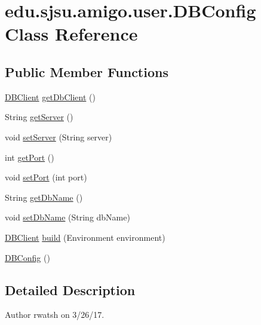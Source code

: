 \hypertarget{classedu_1_1sjsu_1_1amigo_1_1user_1_1_d_b_config}{}\section{edu.\+sjsu.\+amigo.\+user.\+D\+B\+Config Class Reference}
\label{classedu_1_1sjsu_1_1amigo_1_1user_1_1_d_b_config}
\subsection*{Public Member Functions}
\begin{DoxyCompactItemize}
\item 
\hyperlink{interfaceedu_1_1sjsu_1_1amigo_1_1db_1_1common_1_1_d_b_client}{D\+B\+Client} \hyperlink{classedu_1_1sjsu_1_1amigo_1_1user_1_1_d_b_config_af4640d5927a8f24bfba9da51d9485ace}{get\+Db\+Client} ()
\item 
String \hyperlink{classedu_1_1sjsu_1_1amigo_1_1user_1_1_d_b_config_aa621bfa8278d8210594a7dc1388bbed3}{get\+Server} ()
\item 
void \hyperlink{classedu_1_1sjsu_1_1amigo_1_1user_1_1_d_b_config_ac7910a15504582593a1ad04b94f6bd03}{set\+Server} (String server)
\item 
int \hyperlink{classedu_1_1sjsu_1_1amigo_1_1user_1_1_d_b_config_ace95b326c079691b77e11d76667be58e}{get\+Port} ()
\item 
void \hyperlink{classedu_1_1sjsu_1_1amigo_1_1user_1_1_d_b_config_abb3ef6c225e2bde1f020194091bf7704}{set\+Port} (int port)
\item 
String \hyperlink{classedu_1_1sjsu_1_1amigo_1_1user_1_1_d_b_config_acd969ae7cc8de982889a2a223da0fe61}{get\+Db\+Name} ()
\item 
void \hyperlink{classedu_1_1sjsu_1_1amigo_1_1user_1_1_d_b_config_a230be8ce4890d1795acd005ca2adbb15}{set\+Db\+Name} (String db\+Name)
\item 
\hyperlink{interfaceedu_1_1sjsu_1_1amigo_1_1db_1_1common_1_1_d_b_client}{D\+B\+Client} \hyperlink{classedu_1_1sjsu_1_1amigo_1_1user_1_1_d_b_config_a857ab00cb23cfa601bba3ed32803c663}{build} (Environment environment)
\item 
\hyperlink{classedu_1_1sjsu_1_1amigo_1_1user_1_1_d_b_config_a7642e94051547c105d59c60d50b97921}{D\+B\+Config} ()
\end{DoxyCompactItemize}


\subsection{Detailed Description}
\begin{DoxyAuthor}{Author}
rwatsh on 3/26/17. 
\end{DoxyAuthor}


